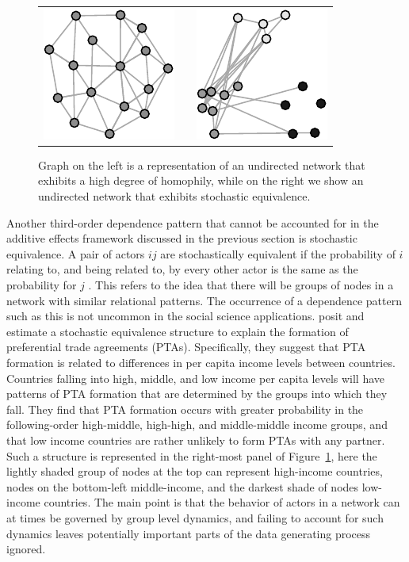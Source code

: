 \documentclass[12pt,onesided,pdflatex]{amsart}
\begin{document}
\begin{figure}[ht]
	\centering
	\begin{tabular}{lcr}
	\includegraphics[width=.33\textwidth]{homophNet} & \hspace{2cm} &
	\includegraphics[width=.33\textwidth]{stochEquivNet}	
	\end{tabular}
	\caption{Graph on the left is a representation of an undirected network that exhibits a high degree of homophily, while on the right we show an undirected network that exhibits stochastic equivalence. }
	\label{fig:homphStochEquivNet}
\end{figure}

Another third-order dependence pattern that cannot be accounted for in the additive effects framework discussed in the previous section is stochastic equivalence. A pair of actors $ij$ are stochastically equivalent if the probability of $i$ relating to, and being related to, by every other actor is the same as the probability for $j$ \citep{anderson:etal:1992}. This refers to the idea that there will be groups of nodes in a network with similar relational patterns. The occurrence of a dependence pattern such as this is not uncommon in the social science applications. \citet{manger:etal:2012} posit and estimate a stochastic equivalence structure to explain the formation of preferential trade agreements (PTAs). Specifically, they suggest that PTA formation is related to differences in per capita income levels between countries. Countries falling into high, middle, and low income per capita levels will have patterns of PTA formation that are determined by the groups into which they fall. They find that PTA formation occurs with greater probability in the following-order high-middle, high-high, and middle-middle income groups, and that low income countries are rather unlikely to form PTAs with any partner. Such a structure is represented in the right-most panel of Figure~\ref{fig:homphStochEquivNet}, here the lightly shaded group of nodes at the top can represent high-income countries, nodes on the bottom-left middle-income, and the darkest shade of nodes low-income countries. The main point is that the behavior of actors in a network can at times be governed by group level dynamics, and failing to account for such dynamics leaves potentially important parts of the data generating process ignored. 
\end{document}
